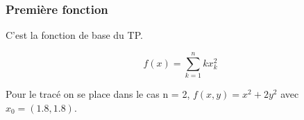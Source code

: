 \documentclass[a4paper,10pt]{article}
\begin{document}
\subsubsection{Première fonction}

\vspace{0.5cm}
\hspace{0.4cm}
C'est la fonction de base du TP. 

$$
f(x) = \sum_{k=1}^{n} kx_k^2
$$

\vspace{0.5cm}
Pour le tracé on se place dans le cas n = 2, $f(x,y) = x^2 + 2y^2$ avec $x_0 = (1.8,1.8)$.

\begin{figure}[H]
	\centering
\end{figure}
\end{document}

